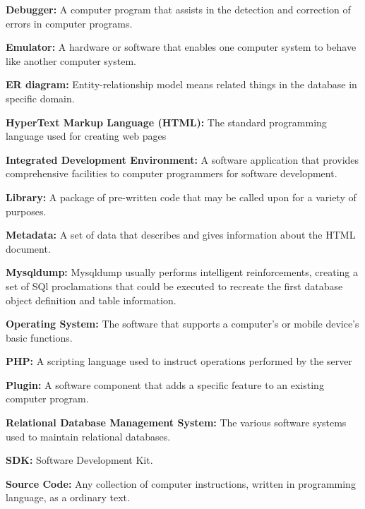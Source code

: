 \documentclass[letterpaper,10pt, draftclsnofoot,onecolumn]{IEEEtran}
\begin{document}
{{{{{\noindent\color{black}\textbf{Debugger:} A computer program that assists in the detection and correction of errors in computer programs.

\noindent\color{black}\textbf{Emulator:} A hardware or software that enables one computer system to behave like another computer system.  

\noindent\color{black}\textbf{ER diagram:} Entity-relationship model means related things in the database in specific domain. 

\noindent\color{black}\textbf{HyperText Markup Language (HTML):} The standard programming language used for creating web pages

\noindent\color{black}\textbf{Integrated Development Environment:} A software application that provides comprehensive facilities to computer programmers for software development.

\noindent\color{black}\textbf{Library:} A package of pre-written code that may be called upon for a variety of purposes.

\noindent\color{black}\textbf{Metadata:} A set of data that describes and gives information about the HTML document. }

\noindent\color{black}\textbf{Mysqldump:} Mysqldump usually performs intelligent reinforcements, creating a set of SQl proclamations that could be executed to recreate the first database object definition and table information.

\noindent\color{black}\textbf{Operating System:} The software that supports a computer's or mobile device's basic functions.

\noindent\color{black}\textbf{PHP:} A scripting language used to instruct operations performed by the server

\noindent\color{black}\textbf{Plugin:} A software component that adds a specific feature to an existing computer program. 

\noindent\color{black}\textbf{Relational Database Management System:} The various software systems used to maintain relational databases.}

\noindent\color{black}\textbf{SDK:} Software Development Kit. 

\noindent\color{black}\textbf{Source Code:} Any collection of computer instructions, written in programming language, as a ordinary text.

}}}
\end{document}
